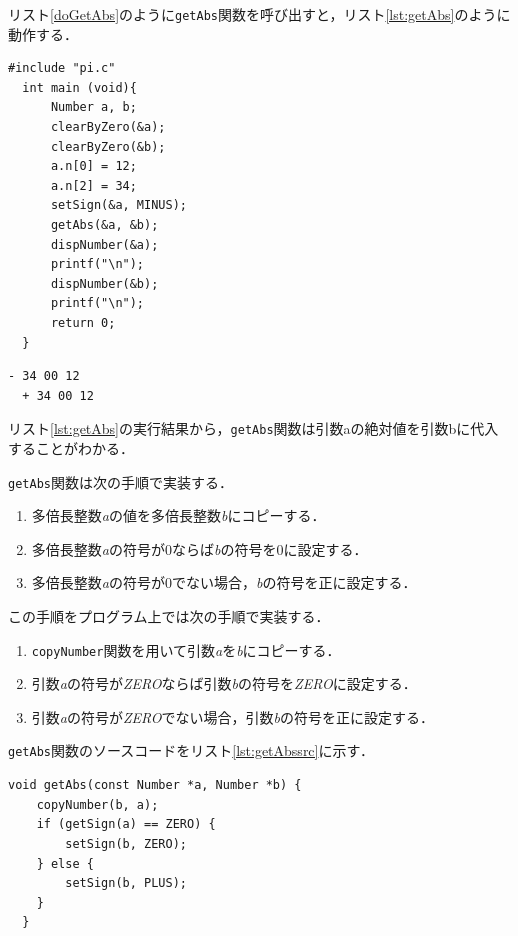 \documentclass[a4paper,11pt,dvipdfmx]{jsarticle}
\begin{document}
リスト\ref{doGetAbs}のように\texttt{getAbs}関数を呼び出すと，リスト\ref{lst:getAbs}のように動作する．
\begin{lstlisting}[caption=\texttt{getAbs}関数の呼び出し,label=doGetAbs]
  #include "pi.c"
  int main (void){
      Number a, b;
      clearByZero(&a);
      clearByZero(&b);
      a.n[0] = 12;
      a.n[2] = 34;
      setSign(&a, MINUS);
      getAbs(&a, &b);
      dispNumber(&a);
      printf("\n");
      dispNumber(&b);
      printf("\n");
      return 0;
  }
\end{lstlisting}

\begin{lstlisting}[caption=リスト\ref{doGetAbs}の実行結果,label=lst:getAbs]
  - 34 00 12
  + 34 00 12
\end{lstlisting}

リスト\ref{lst:getAbs}の実行結果から，\texttt{getAbs}関数は引数aの絶対値を引数bに代入することがわかる．

\texttt{getAbs}関数は次の手順で実装する．
\begin{enumerate}
  \item 多倍長整数\textit{a}の値を多倍長整数\textit{b}にコピーする．
  \item 多倍長整数\textit{a}の符号が0ならば\textit{b}の符号を0に設定する．
  \item 多倍長整数\textit{a}の符号が0でない場合，\textit{b}の符号を正に設定する．
\end{enumerate}

この手順をプログラム上では次の手順で実装する．
\begin{enumerate}
  \item \texttt{copyNumber}関数を用いて引数\textit{a}を\textit{b}にコピーする．
  \item 引数\textit{a}の符号が\textit{ZERO}ならば引数\textit{b}の符号を\textit{ZERO}に設定する．
  \item 引数\textit{a}の符号が\textit{ZERO}でない場合，引数\textit{b}の符号を正に設定する．
\end{enumerate}

\texttt{getAbs}関数のソースコードをリスト\ref{lst:getAbssrc}に示す．

\begin{lstlisting}[caption=getAbs関数,label=lst:getAbssrc]
  void getAbs(const Number *a, Number *b) {
    copyNumber(b, a);
    if (getSign(a) == ZERO) {
        setSign(b, ZERO);
    } else {
        setSign(b, PLUS);
    }
  }
\end{lstlisting}
\end{document}

